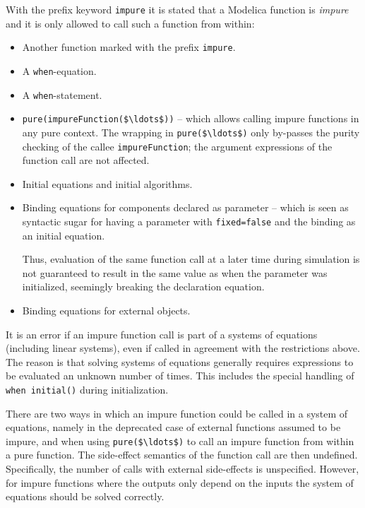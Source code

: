 With the prefix keyword \lstinline!impure! it is stated that a Modelica function is \emph{impure} and it is only allowed to call such a function from within:
\begin{itemize}
\item
  Another function marked with the prefix \lstinline!impure!.
\item
  A \lstinline!when!-equation.
\item
  A \lstinline!when!-statement.
\item
  \lstinline!pure(impureFunction($\ldots$))! -- which allows calling impure functions in any pure context.
  The wrapping in \lstinline!pure($\ldots$)! only by-passes the purity checking of the callee \lstinline!impureFunction!; the argument expressions of the function call are not affected.
\item
  Initial equations and initial algorithms.
\item
  Binding equations for components declared as parameter -- which is seen as syntactic sugar for having a parameter with \lstinline!fixed=false! and the binding as an initial equation.
  \begin{nonnormative}
  Thus, evaluation of the same function call at a later time during simulation is not guaranteed to result in the same value as when the parameter was initialized, seemingly breaking the declaration equation.
  \end{nonnormative}
\item
  Binding equations for external objects.
\end{itemize}

It is an error if an impure function call is part of a systems of equations (including linear systems), even if called in agreement with the restrictions above.
The reason is that solving systems of equations generally requires expressions to be evaluated an unknown number of times.
This includes the special handling of \lstinline!when initial()! during initialization.

There are two ways in which an impure function could be called in a system of equations, namely in the deprecated case of external functions assumed to be impure, and when using \lstinline!pure($\ldots$)! to call an impure function from within a pure function.
The side-effect semantics of the function call are then undefined.
Specifically, the number of calls with external side-effects is unspecified.
However, for impure functions where the outputs only depend on the inputs the system of equations should be solved correctly.

